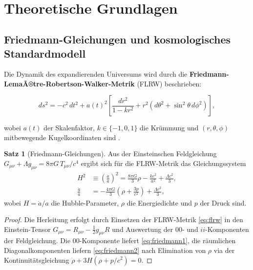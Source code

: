 ﻿\documentclass[a4paper,12pt]{article}
\theoremstyle{definition}
\newtheorem{satz}{Satz}[section]
\theoremstyle{remark}
\begin{document}
\section{Theoretische Grundlagen}
\label{sec:theorie}

\subsection{Friedmann-Gleichungen und kosmologisches Standardmodell}

Die Dynamik des expandierenden Universums wird durch die
\textbf{Friedmann-LemaÃ®tre-Robertson-Walker-Metrik} (FLRW) beschrieben:

\begin{equation}
  \label{eq:flrw}
  ds^2 = -c^2\,dt^2 + a(t)^2 \left[\frac{dr^2}{1-kr^2}
         + r^2\left(d\theta^2 + \sin^2\theta\,d\phi^2\right)\right],
\end{equation}

wobei $a(t)$ der Skalenfaktor, $k \in \{-1,0,1\}$ die Krümmung und $(r,\theta,\phi)$
mitbewegende Kugelkoordinaten sind \cite{dodelson2003}.

\begin{satz}[Friedmann-Gleichungen]
  Aus der Einsteinschen Feldgleichung $G_{\mu\nu} + \Lambda g_{\mu\nu} = 8\pi G\, T_{\mu\nu}/c^4$
  ergibt sich für die FLRW-Metrik das Gleichungssystem
  \begin{align}
    \label{eq:friedmann1}
    H^2 &\equiv \left(\frac{\dot{a}}{a}\right)^2
       = \frac{8\pi G}{3}\rho - \frac{kc^2}{a^2} + \frac{\Lambda c^2}{3}, \\
    \label{eq:friedmann2}
    \frac{\ddot{a}}{a} &= -\frac{4\pi G}{3}\left(\rho + \frac{3p}{c^2}\right)
       + \frac{\Lambda c^2}{3},
  \end{align}
  wobei $H = \dot{a}/a$ die Hubble-Parameter, $\rho$ die Energiedichte und $p$
  der Druck sind.
\end{satz}

\begin{proof}
  Die Herleitung erfolgt durch Einsetzen der FLRW-Metrik \eqref{eq:flrw} in den
  Einstein-Tensor $G_{\mu\nu} = R_{\mu\nu} - \frac{1}{2}g_{\mu\nu}R$ und
  Auswertung der $00$- und $ii$-Komponenten der Feldgleichung. Die
  $00$-Komponente liefert \eqref{eq:friedmann1}, die räumlichen Diagonalkomponenten
  liefern \eqref{eq:friedmann2} nach Elimination von $\rho$ via der
  Kontinuitätsgleichung $\dot\rho + 3H(\rho + p/c^2) = 0$.
\end{proof}
\end{document}
